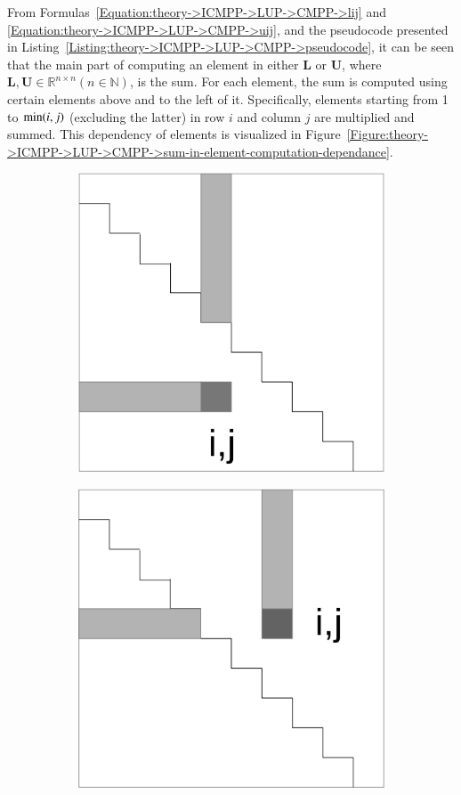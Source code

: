 From Formulas~\ref{Equation:theory->ICMPP->LUP->CMPP->lij} and \ref{Equation:theory->ICMPP->LUP->CMPP->uij}, and the pseudocode presented in Listing~\ref{Listing:theory->ICMPP->LUP->CMPP->pseudocode}, it can be seen that the main part of computing an element in either $\mathbf{L}$ or $\mathbf{U}$, where $\mathbf{L}, \mathbf{U} \in \mathbb{R}^{n \times n} \left(n \in \mathbb{N}\right)$, is the sum.
For each element, the sum is computed using certain elements above and to the left of it.
Specifically, elements starting from 1 to $\minp{i,j}$ (excluding the latter) in row $i$ and column $j$ are multiplied and summed.
This dependency of elements is visualized in Figure~\ref{Figure:theory->ICMPP->LUP->CMPP->sum-in-element-computation-dependance}.

\begin{figure}[ht!]
	\centering
	\begin{subfigure}{.5\textwidth}
		\centering
		\includegraphics[width=.8\textwidth, keepaspectratio]{images/ch01/CMPP_elements_used_compute_sum_L.png}
		\label{Figure:theory->ICMPP->LUP->CMPP->sum-in-element-computation-dependance-L}
	\end{subfigure}%
	\begin{subfigure}{.5\textwidth}
		\centering
		\includegraphics[width=.8\textwidth, keepaspectratio]{images/ch01/CMPP_elements_used_compute_sum_U.png}

\end{subfigure}
\end{figure}
